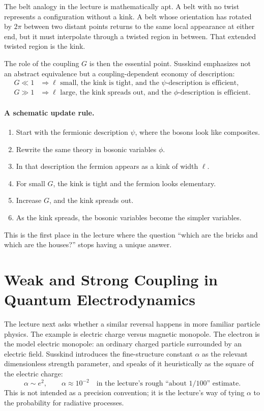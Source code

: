 The belt analogy in the lecture is mathematically apt. A belt with no twist represents a configuration without a kink. A belt whose orientation has rotated by \(2\pi\) between two distant points returns to the same local appearance at either end, but it must interpolate through a twisted region in between. That extended twisted region is the kink.

The role of the coupling \(G\) is then the essential point. Susskind emphasizes not an abstract equivalence but a coupling-dependent economy of description:
\begin{align}
G\ll 1
&\Rightarrow
\ell \text{ small, the kink is tight, and the }\psi\text{-description is efficient},\\
G\gg 1
&\Rightarrow
\ell \text{ large, the kink spreads out, and the }\phi\text{-description is efficient}.
\end{align}

\paragraph{A schematic update rule.}
\begin{enumerate}
\item Start with the fermionic description \(\psi\), where the bosons look like composites.
\item Rewrite the same theory in bosonic variables \(\phi\).
\item In that description the fermion appears as a kink of width \(\ell\).
\item For small \(G\), the kink is tight and the fermion looks elementary.
\item Increase \(G\), and the kink spreads out.
\item As the kink spreads, the bosonic variables become the simpler variables.
\end{enumerate}

This is the first place in the lecture where the question ``which are the bricks and which are the houses?'' stops having a unique answer.

\section{Weak and Strong Coupling in Quantum Electrodynamics}

The lecture next asks whether a similar reversal happens in more familiar particle physics. The example is electric charge versus magnetic monopole. The electron is the model electric monopole: an ordinary charged particle surrounded by an electric field. Susskind introduces the fine-structure constant \(\alpha\) as the relevant dimensionless strength parameter, and speaks of it heuristically as the square of the electric charge:
\begin{equation}
\alpha \sim e^2,
\qquad
\alpha \approx 10^{-2}
\quad
\text{in the lecture's rough ``about \(1/100\)'' estimate.}
\end{equation}
This is not intended as a precision convention; it is the lecture's way of tying \(\alpha\) to the probability for radiative processes.

